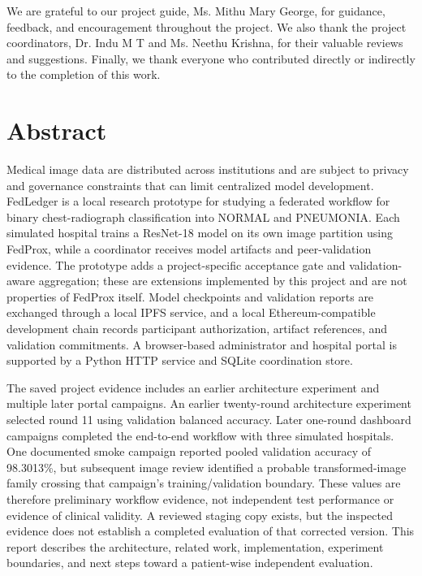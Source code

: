 \documentclass[12pt,a4paper]{report}
\begin{document}
We are grateful to our project guide, Ms. Mithu Mary George, for guidance, feedback, and encouragement throughout the project. We also thank the project coordinators, Dr. Indu M T and Ms. Neethu Krishna, for their valuable reviews and suggestions. Finally, we thank everyone who contributed directly or indirectly to the completion of this work.

\newpage
\chapter*{Abstract}
Medical image data are distributed across institutions and are subject to privacy and governance constraints that can limit centralized model development. FedLedger is a local research prototype for studying a federated workflow for binary chest-radiograph classification into NORMAL and PNEUMONIA. Each simulated hospital trains a ResNet-18 model on its own image partition using FedProx, while a coordinator receives model artifacts and peer-validation evidence. The prototype adds a project-specific acceptance gate and validation-aware aggregation; these are extensions implemented by this project and are not properties of FedProx itself. Model checkpoints and validation reports are exchanged through a local IPFS service, and a local Ethereum-compatible development chain records participant authorization, artifact references, and validation commitments. A browser-based administrator and hospital portal is supported by a Python HTTP service and SQLite coordination store.

The saved project evidence includes an earlier architecture experiment and multiple later portal campaigns. An earlier twenty-round architecture experiment selected round 11 using validation balanced accuracy. Later one-round dashboard campaigns completed the end-to-end workflow with three simulated hospitals. One documented smoke campaign reported pooled validation accuracy of 98.3013\%, but subsequent image review identified a probable transformed-image family crossing that campaign's training/validation boundary. These values are therefore preliminary workflow evidence, not independent test performance or evidence of clinical validity. A reviewed staging copy exists, but the inspected evidence does not establish a completed evaluation of that corrected version. This report describes the architecture, related work, implementation, experiment boundaries, and next steps toward a patient-wise independent evaluation.
\end{document}
